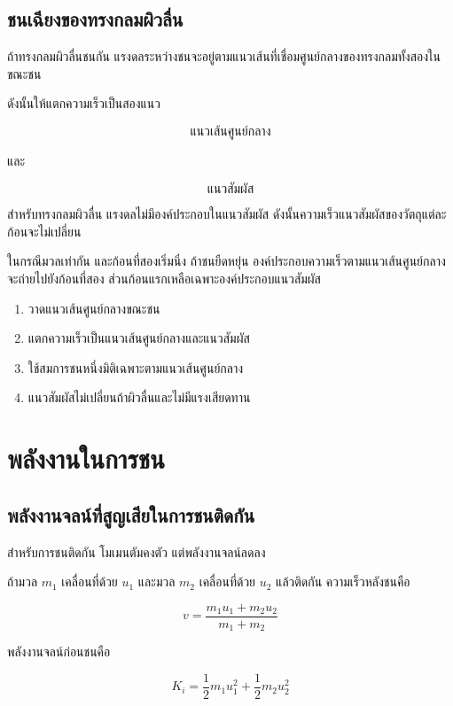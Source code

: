 \subsection{ชนเฉียงของทรงกลมผิวลื่น}

ถ้าทรงกลมผิวลื่นชนกัน แรงดลระหว่างชนจะอยู่ตามแนวเส้นที่เชื่อมศูนย์กลางของทรงกลมทั้งสองในขณะชน

ดังนั้นให้แตกความเร็วเป็นสองแนว

\[
\text{แนวเส้นศูนย์กลาง}
\]

และ

\[
\text{แนวสัมผัส}
\]

สำหรับทรงกลมผิวลื่น แรงดลไม่มีองค์ประกอบในแนวสัมผัส ดังนั้นความเร็วแนวสัมผัสของวัตถุแต่ละก้อนจะไม่เปลี่ยน

ในกรณีมวลเท่ากัน และก้อนที่สองเริ่มนิ่ง ถ้าชนยืดหยุ่น องค์ประกอบความเร็วตามแนวเส้นศูนย์กลางจะถ่ายไปยังก้อนที่สอง ส่วนก้อนแรกเหลือเฉพาะองค์ประกอบแนวสัมผัส

\begin{tcolorbox}[title=กลยุทธ์สำหรับชนเฉียง]
\begin{enumerate}
    \item วาดแนวเส้นศูนย์กลางขณะชน
    \item แตกความเร็วเป็นแนวเส้นศูนย์กลางและแนวสัมผัส
    \item ใช้สมการชนหนึ่งมิติเฉพาะตามแนวเส้นศูนย์กลาง
    \item แนวสัมผัสไม่เปลี่ยนถ้าผิวลื่นและไม่มีแรงเสียดทาน
\end{enumerate}
\end{tcolorbox}

\section{พลังงานในการชน}

\subsection{พลังงานจลน์ที่สูญเสียในการชนติดกัน}

สำหรับการชนติดกัน โมเมนตัมคงตัว แต่พลังงานจลน์ลดลง

ถ้ามวล $m_1$ เคลื่อนที่ด้วย $u_1$ และมวล $m_2$ เคลื่อนที่ด้วย $u_2$ แล้วติดกัน ความเร็วหลังชนคือ

\[
v=\frac{m_1u_1+m_2u_2}{m_1+m_2}
\]

พลังงานจลน์ก่อนชนคือ

\[
K_i=\frac{1}{2}m_1u_1^2+\frac{1}{2}m_2u_2^2
\]

